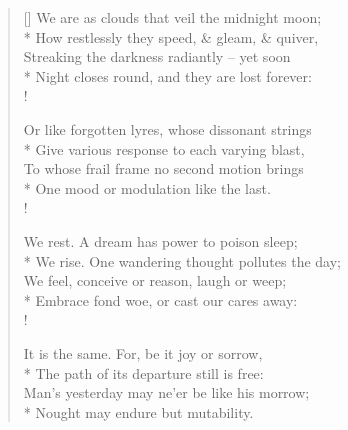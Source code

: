 \documentclass[MAIN]{subfiles}
\begin{document}
\settowidth{\versewidth}{We are as clouds that veil the midnight moon;}
\begin{verse}[\versewidth]
We are as clouds that veil the midnight moon;\\*
\vin How restlessly they speed, \& gleam, \& quiver,\\
Streaking the darkness radiantly -- yet soon\\*
\vin Night closes round, and they are lost forever:\\!

Or like forgotten lyres, whose dissonant strings\\*
\vin Give various response to each varying blast,\\
To whose frail frame no second motion brings\\*
\vin One mood or modulation like the last.\\!

We rest. A dream has power to poison sleep;\\*
\vin We rise. One wandering thought pollutes the day;\\
We feel, conceive or reason, laugh or weep;\\*
\vin Embrace fond woe, or cast our cares away:\\!

It is the same. For, be it joy or sorrow,\\*
\vin The path of its departure still is free:\\
Man's yesterday may ne'er be like his morrow;\\*
\vin Nought may endure but mutability.
\end{verse}
\end{document}
